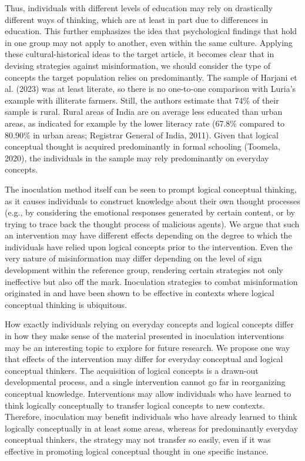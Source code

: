 \documentclass[authordate, empirical]{jote-new-article}
\begin{document}
	Thus, individuals with different levels of education may rely on drastically different ways of thinking, which are at least in part due to differences in education. This further emphasizes the idea that psychological findings that hold in one group may not apply to another, even within the same culture. Applying these cultural-historical ideas to the target article, it becomes clear that in devising strategies against misinformation, we should consider the type of concepts the target population relies on predominantly. The sample of Harjani et al. (2023) was at least literate, so there is no one-to-one comparison with Luria's example with illiterate farmers. Still, the authors estimate that 74\% of their sample is rural. Rural areas of India are on average less educated than urban areas, as indicated for example by the lower literacy rate (67.8\% compared to 80.90\% in urban areas; Registrar General of India, 2011). Given that logical conceptual thought is acquired predominantly in formal schooling (Toomela, 2020), the individuals in the sample may rely predominantly on everyday concepts.



	The inoculation method itself can be seen to prompt logical conceptual thinking, as it causes individuals to construct knowledge about their own thought processes (e.g., by considering the emotional responses generated by certain content, or by trying to trace back the thought process of malicious agents). We argue that such an intervention may have different effects depending on the degree to which the individuals have relied upon logical concepts prior to the intervention. Even the very nature of misinformation may differ depending on the level of sign development within the reference group, rendering certain strategies not only ineffective but also off the mark. Inoculation strategies to combat misinformation originated in and have been shown to be effective in contexts where logical conceptual thinking is ubiquitous.



	How exactly individuals relying on everyday concepts and logical concepts differ in how they make sense of the material presented in inoculation interventions may be an interesting topic to explore for future research. We propose one way that effects of the intervention may differ for everyday conceptual and logical conceptual thinkers. The acquisition of logical concepts is a drawn-out developmental process, and a single intervention cannot go far in reorganizing conceptual knowledge. Interventions may allow individuals who have learned to think logically conceptually to transfer logical concepts to new contexts. Therefore, inoculation may benefit individuals who have already learned to think logically conceptually in at least some areas, whereas for predominantly everyday conceptual thinkers, the strategy may not transfer so easily, even if it was effective in promoting logical conceptual thought in one specific instance.
\end{document}
